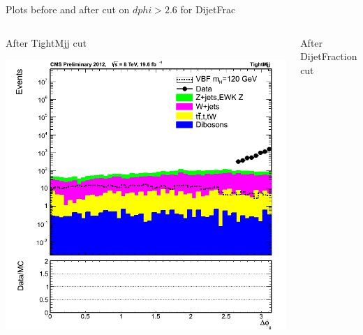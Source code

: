\documentclass[8pt]{beamer}
\begin{document}
\begin{frame}{Plots before and after cut on $dphi>2.6$ for DijetFrac}

\begin{columns}
  
\column[t]{5.5cm}   
\begin{block}{After TightMjj cut}

  \begin{center}
  \includegraphics[width=1.00\textwidth]{img/dphijj_2012_TightMjj_log.png}
  \end{center}

\end{block}
  
\column[t]{5.5cm}
\begin{block}{After DijetFraction cut}


\end{block}
\end{columns}
\end{frame}
\end{document}
